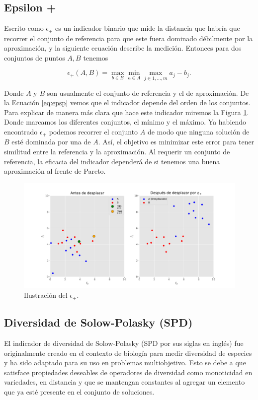 \subsection{Epsilon +} \label{sec:Epsilonp}
Escrito como $\epsilon_+$ es un indicador binario que mide la distancia que habría que recorrer el conjunto de referencia para que este fuera dominado débilmente por la aproximación, y la siguiente ecuación describe la medición. Entonces para dos conjuntos de puntos $A,B$ tenemos

\begin{equation} \label{eq:epsp}
    \epsilon_+(A,B)= \max_{b\in B} \min_{a\in A}\max_{j\in 1,\ldots, m} a_j-b_j. 
\end{equation}

Donde $A$ y $B$ son usualmente el conjunto de referencia y el de aproximación. De la Ecuación \ref{eq:epsp} vemos que el indicador depende del orden de los conjuntos.
Para explicar de manera más clara que hace este indicador miremos la Figura \ref{fig:epsp}. Donde marcamos los diferentes conjuntos, el mínimo y el máximo. Ya habiendo encontrado $\epsilon_+$ podemos recorrer el conjunto $A$ de modo que ninguna solución de $B$ esté dominada por una de $A$. Así, el objetivo es minimizar este error para tener similitud entre la referencia y la aproximación. Al requerir un conjunto de referencia, la eficacia del indicador dependerá de si tenemos una buena aproximación al frente de Pareto. 

\begin{figure}[H]
    \centering
    \includegraphics[width=\textwidth]{Figuras/epsp.pdf}
    \caption[$\epsilon+$]{Ilustración del $\epsilon_+$.}
    \label{fig:epsp}
\end{figure}

\subsection{Diversidad de Solow-Polasky (SPD)} \label{sec:SPD}
El indicador de diversidad de Solow-Polasky (SPD por sus siglas en inglés) fue originalmente creado en el contexto de biología para medir diversidad de especies y ha sido adaptado para su uso en problemas multiobjetivo. Esto se debe a que satisface propiedades deseables de operadores de diversidad \cite{SPD} como monoticidad en variedades, en distancia y que se mantengan constantes al agregar un elemento que ya esté presente en el conjunto de soluciones.

